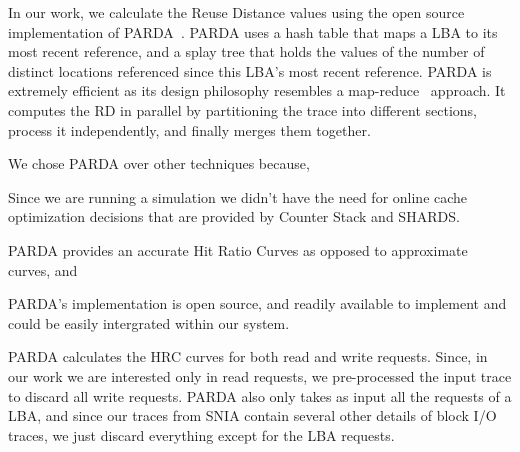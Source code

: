 In our work, we calculate the Reuse Distance values using the open source implementation of PARDA~\cite{niu_parda:_2012}. PARDA uses a hash table that maps a LBA to its most recent reference, and a splay tree that holds the values of the number of distinct locations referenced since this LBA's most recent reference. PARDA is extremely efficient as its design philosophy resembles a map-reduce~\cite{} approach. It computes the RD in parallel by partitioning the trace into different sections, process it independently, and finally merges them together.

We chose PARDA over other techniques because,
\begin{enumerate*}
\item Since we are running a simulation we didn't have the need for online cache optimization decisions that are provided by Counter Stack and SHARDS.
\item PARDA provides an accurate Hit Ratio Curves as opposed to approximate curves, and
\item PARDA's implementation is open source, and readily available to implement and could be easily intergrated within our system.
\end{enumerate*}
PARDA calculates the HRC curves for both read and write requests. Since, in our work we are interested only in read requests, we pre-processed the input trace to discard all write requests. PARDA also only takes as input all the requests of a LBA, and since our traces from SNIA contain several other details of block I/O traces, we just discard everything except for the LBA requests. 



